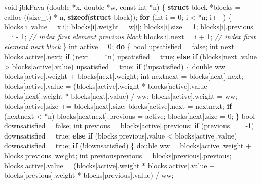 \documentclass[12pt,]{article}
\newenvironment{Shaded}{\begin{snugshade}}{\end{snugshade}}
\newcommand{\KeywordTok}[1]{\textcolor[rgb]{0.13,0.29,0.53}{\textbf{{#1}}}}
\newcommand{\DataTypeTok}[1]{\textcolor[rgb]{0.13,0.29,0.53}{{#1}}}
\newcommand{\DecValTok}[1]{\textcolor[rgb]{0.00,0.00,0.81}{{#1}}}
\newcommand{\CommentTok}[1]{\textcolor[rgb]{0.56,0.35,0.01}{\textit{{#1}}}}
\newcommand{\NormalTok}[1]{{#1}}
\begin{document}
\begin{Shaded}
\begin{Highlighting}[]
\DataTypeTok{void} \NormalTok{jbkPava (}\DataTypeTok{double} \NormalTok{*x, }\DataTypeTok{double} \NormalTok{*w, }\DataTypeTok{const} \DataTypeTok{int} \NormalTok{*n) \{}
    \KeywordTok{struct} \NormalTok{block *blocks = calloc ((size_t) * n, }\KeywordTok{sizeof}\NormalTok{(}\KeywordTok{struct} \NormalTok{block));}
    \KeywordTok{for} \NormalTok{(}\DataTypeTok{int} \NormalTok{i = }\DecValTok{0}\NormalTok{; i < *n; i++) \{}
        \NormalTok{blocks[i].value = x[i];}
        \NormalTok{blocks[i].weight = w[i];}
        \NormalTok{blocks[i].size = }\DecValTok{1}\NormalTok{;}
        \NormalTok{blocks[i].previous = i - }\DecValTok{1}\NormalTok{; }\CommentTok{// index first element previous block}
        \NormalTok{blocks[i].next = i + }\DecValTok{1}\NormalTok{;     }\CommentTok{// index first element next block}
    \NormalTok{\}}
    \DataTypeTok{int} \NormalTok{active = }\DecValTok{0}\NormalTok{;}
    \KeywordTok{do} \NormalTok{\{}
        \NormalTok{bool upsatisfied = false;}
        \DataTypeTok{int} \NormalTok{next = blocks[active].next;}
        \KeywordTok{if} \NormalTok{(next == *n) upsatisfied = true;}
        \KeywordTok{else} \KeywordTok{if} \NormalTok{(blocks[next].value > blocks[active].value) upsatisfied = true;}
        \KeywordTok{if} \NormalTok{(!upsatisfied) \{}
            \DataTypeTok{double} \NormalTok{ww = blocks[active].weight + blocks[next].weight;}
            \DataTypeTok{int} \NormalTok{nextnext = blocks[next].next;}
            \NormalTok{blocks[active].value = (blocks[active].weight * blocks[active].value + blocks[next].weight * blocks[next].value) / ww;}
            \NormalTok{blocks[active].weight = ww;}
            \NormalTok{blocks[active].size += blocks[next].size;}
            \NormalTok{blocks[active].next = nextnext;}
            \KeywordTok{if} \NormalTok{(nextnext < *n)}
                \NormalTok{blocks[nextnext].previous = active;}
            \NormalTok{blocks[next].size = }\DecValTok{0}\NormalTok{;}
        \NormalTok{\}}
        \NormalTok{bool downsatisfied = false;}
        \DataTypeTok{int} \NormalTok{previous = blocks[active].previous;}
        \KeywordTok{if} \NormalTok{(previous == -}\DecValTok{1}\NormalTok{) downsatisfied = true;}
        \KeywordTok{else} \KeywordTok{if} \NormalTok{(blocks[previous].value < blocks[active].value) downsatisfied = true;}
        \KeywordTok{if} \NormalTok{(!downsatisfied) \{}
            \DataTypeTok{double} \NormalTok{ww = blocks[active].weight + blocks[previous].weight;}
            \DataTypeTok{int} \NormalTok{previousprevious = blocks[previous].previous;}
            \NormalTok{blocks[active].value = (blocks[active].weight * blocks[active].value + blocks[previous].weight * blocks[previous].value) / ww;}

\end{Highlighting}
\end{Shaded}
\end{document}
